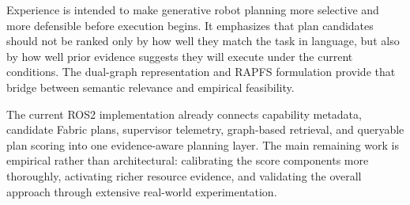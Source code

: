 \documentclass[letterpaper, 10pt, conference]{ieeeconf}
\begin{document}
Experience is intended to make generative robot planning more selective and more defensible before execution begins. It emphasizes that plan candidates should not be ranked only by how well they match the task in language, but also by how well prior evidence suggests they will execute under the current conditions. The dual-graph representation and RAPFS formulation provide that bridge between semantic relevance and empirical feasibility.

The current ROS2 implementation already connects capability metadata, candidate Fabric plans, supervisor telemetry, graph-based retrieval, and queryable plan scoring into one evidence-aware planning layer. The main remaining work is empirical rather than architectural: calibrating the score components more thoroughly, activating richer resource evidence, and validating the overall approach through extensive real-world experimentation.



\end{document}
